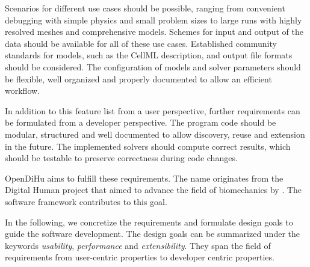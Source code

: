 Scenarios for different use cases should be possible, ranging from convenient debugging with simple physics and small problem sizes to large runs with highly resolved meshes and comprehensive models. Schemes for input and output of the data should be available for all of these use cases. Established community standards for models, such as the CellML description, and output file formats should be considered.
The configuration of models and solver parameters should be flexible, well organized and properly documented to allow an efficient workflow.


In addition to this feature list from a user perspective, further requirements can be formulated from a developer perspective.
The program code should be modular, structured and well documented to allow discovery, reuse and extension in the future. The implemented solvers should compute correct results, which should be testable to preserve correctness during code changes.

OpenDiHu aims to fulfill these requirements.
The name originates from the Digital Human project that aimed to advance the field of biomechanics by  \cite{DihuWeb}. The software framework contributes to this goal.

In the following, we concretize the requirements and formulate design goals to guide the software development.
The design goals can be summarized under the keywords \emph{usability}, \emph{performance} and \emph{extensibility}. They span the field of requirements from user-centric properties to developer centric properties.

